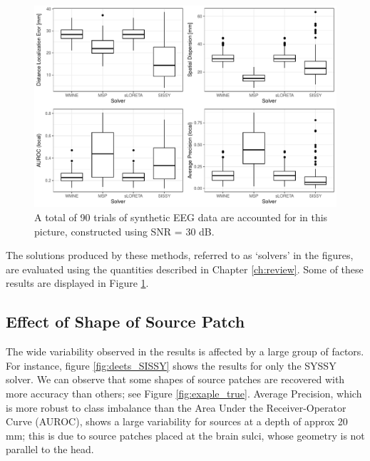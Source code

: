 \begin{figure}
    \centering
    \includegraphics[width=0.95\linewidth]{img_stats/plot_EvalMetrics_Protocol04_30ALL.pdf}
    \caption{A total of 90 trials of synthetic EEG data are accounted for in this picture, constructed using SNR = 30 dB.}
    \label{fig:results1}
\end{figure}

The solutions produced by these methods, referred to as `solvers' in the figures, are evaluated using the quantities described in Chapter \ref{ch:review}.
%
Some of these results are displayed in Figure \ref{fig:results1}.

\subsection{Effect of Shape of Source Patch}

The wide variability observed in the results is affected by a large group of factors.
%
For instance, figure \ref{fig:deets_SISSY} shows the results for only the SYSSY solver.
%
We can observe that some shapes of source patches are recovered with more accuracy than others; see Figure \ref{fig:exaple_true}.
%
Average Precision, which is more robust to class imbalance than the Area Under the Receiver-Operator Curve (AUROC), shows a large variability for sources at a depth of approx 20 mm; this is due to source patches placed at the brain sulci, whose geometry is not parallel to the head.

